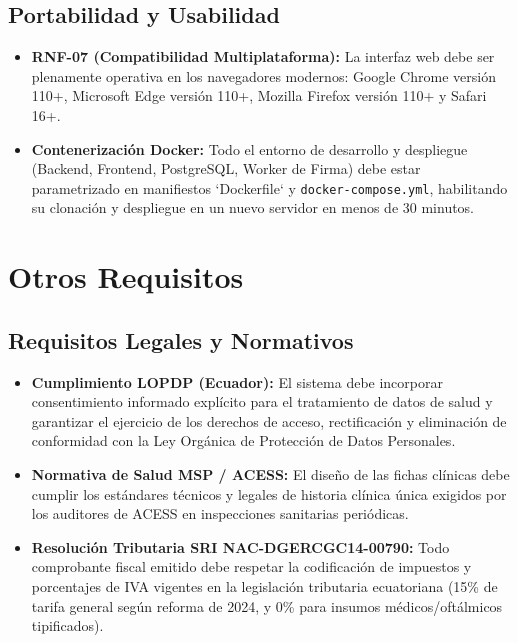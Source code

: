 \documentclass[12pt,a4paper]{report}
\begin{document}
\subsection{Portabilidad y Usabilidad}
\begin{itemize}
    \item \textbf{RNF-07 (Compatibilidad Multiplataforma):} La interfaz web debe ser plenamente operativa en los navegadores modernos: Google Chrome versión 110+, Microsoft Edge versión 110+, Mozilla Firefox versión 110+ y Safari 16+.
    \item \textbf{Contenerización Docker:} Todo el entorno de desarrollo y despliegue (Backend, Frontend, PostgreSQL, Worker de Firma) debe estar parametrizado en manifiestos `Dockerfile` y \texttt{docker-compose.yml}, habilitando su clonación y despliegue en un nuevo servidor en menos de 30 minutos.
\end{itemize}

\section{Otros Requisitos}

\subsection{Requisitos Legales y Normativos}
\begin{itemize}
    \item \textbf{Cumplimiento LOPDP (Ecuador):} El sistema debe incorporar consentimiento informado explícito para el tratamiento de datos de salud y garantizar el ejercicio de los derechos de acceso, rectificación y eliminación de conformidad con la Ley Orgánica de Protección de Datos Personales.
    \item \textbf{Normativa de Salud MSP / ACESS:} El diseño de las fichas clínicas debe cumplir los estándares técnicos y legales de historia clínica única exigidos por los auditores de ACESS en inspecciones sanitarias periódicas.
    \item \textbf{Resolución Tributaria SRI NAC-DGERCGC14-00790:} Todo comprobante fiscal emitido debe respetar la codificación de impuestos y porcentajes de IVA vigentes en la legislación tributaria ecuatoriana (15\% de tarifa general según reforma de 2024, y 0\% para insumos médicos/oftálmicos tipificados).
\end{itemize}
\end{document}
